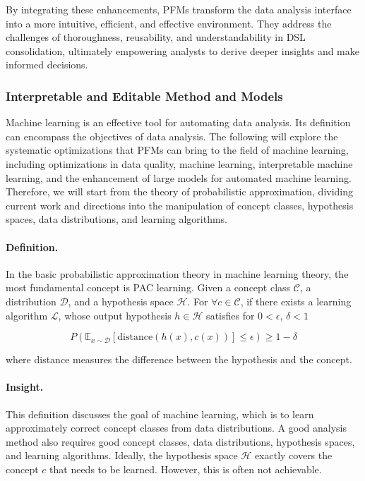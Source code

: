   By integrating these enhancements, PFMs transform the data analysis interface into a more intuitive, efficient, and effective environment. They address the challenges of thoroughness, reusability, and understandability in DSL consolidation, ultimately empowering analysts to derive deeper insights and make informed decisions.
  
  
  
  \subsubsection{Interpretable and Editable Method and Models}\label{sec:editability}
  
  Machine learning is an effective tool for automating data analysis. Its definition can encompass the objectives of data analysis. The following will explore the systematic optimizations that PFMs can bring to the field of machine learning, including optimizations in data quality, machine learning, interpretable machine learning, and the enhancement of large models for automated machine learning. Therefore, we will start from the theory of probabilistic approximation, dividing current work and directions into the manipulation of concept classes, hypothesis spaces, data distributions, and learning algorithms.
  
  \paragraph{Definition.} In the basic probabilistic approximation theory in machine learning theory, the most fundamental concept is PAC learning. Given a concept class $\mathcal{C}$, a distribution $\mathcal{D}$, and a hypothesis space $\mathcal{H}$. For $\forall c \in \mathcal{C}$, if there exists a learning algorithm $\mathcal{L}$, whose output hypothesis $h \in \mathcal{H}$ satisfies for $0<\epsilon$, $\delta < 1$ 
  
  \begin{equation} P(\mathbb{E}_{x\sim \mathcal{D}}[\text{distance}(h(x), c(x))] \leq \epsilon) \geq 1-\delta \end{equation}
  
  where distance measures the difference between the hypothesis and the concept.
  
  \paragraph{Insight.} This definition discusses the goal of machine learning, which is to learn approximately correct concept classes from data distributions. A good analysis method also requires good concept classes, data distributions, hypothesis spaces, and learning algorithms. Ideally, the hypothesis space $\mathcal{H}$ exactly covers the concept $c$ that needs to be learned. However, this is often not achievable.
  
